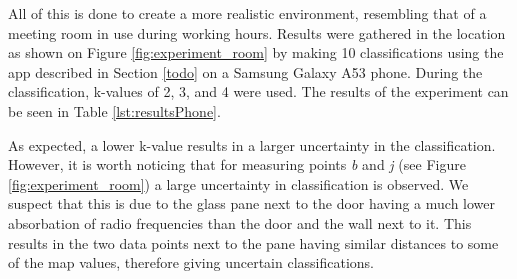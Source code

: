 All of this is done to create a more realistic environment, resembling that of a meeting room in use during working hours. 
Results were gathered in the location as shown on Figure \ref{fig:experiment_room} by making 10 classifications using the app described in Section \ref{todo}  on a Samsung Galaxy A53 phone.
During the classification, k-values of 2, 3, and 4 were used. 
The results of the experiment can be seen in Table \ref{lst:resultsPhone}.

As expected, a lower k-value results in a larger uncertainty in the classification.
However, it is worth noticing that for measuring points \textit{b} and \textit{j}  (see Figure \ref{fig:experiment_room}) a large uncertainty in classification is observed.  
We suspect that this is due to the glass pane next to the door having a much lower absorbation of radio frequencies than the door and the wall next to it. 
This results in the two data points next to the pane having similar distances to some of the map values, therefore giving uncertain classifications. 
